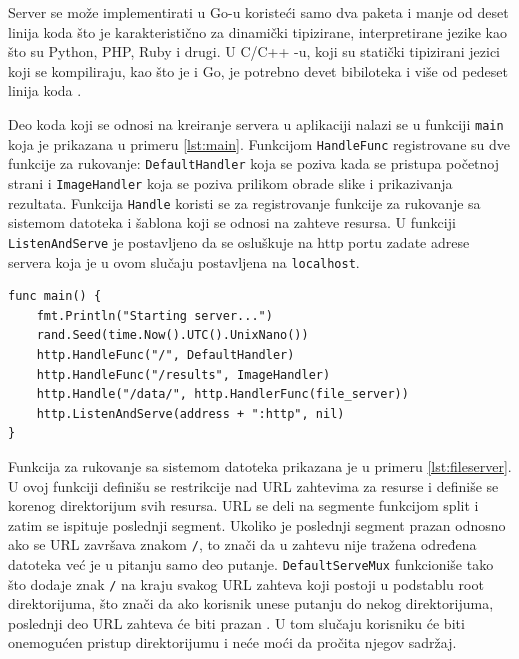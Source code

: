 \documentclass[12pt,oneside]{memoir}
\begin{document}
Server se može implementirati u Go-u  koristeći samo dva paketa i manje od deset linija koda što je karakteristično za dinamički tipizirane, interpretirane jezike kao što su Python, PHP, Ruby i drugi. U C/C++ -u, koji su statički tipizirani jezici koji se kompiliraju, kao što je i Go, je potrebno devet bibiloteka i više od pedeset linija koda \cite{server}.

Deo koda koji se odnosi na kreiranje servera u aplikaciji nalazi se u funkciji \texttt{main} koja je prikazana u primeru \ref{lst:main}. Funkcijom \texttt{HandleFunc} registrovane su dve funkcije za rukovanje: \texttt{DefaultHandler} koja se poziva kada se pristupa početnoj strani i \texttt{ImageHandler} koja se poziva prilikom obrade slike i prikazivanja rezultata. Funkcija \texttt{Handle} koristi se za registrovanje funkcije za rukovanje sa sistemom datoteka i šablona koji se odnosi na zahteve resursa.  U funkciji \texttt{ListenAndServe} je postavljeno da se osluškuje na http portu zadate adrese servera koja je u ovom slučaju postavljena na \texttt{localhost}.

\begin{center}
\begin{lstlisting}[caption={Funkcija \texttt{main}, kreiranje servera},label={lst:main},  backgroundcolor=\color{background} ]
func main() {
	fmt.Println("Starting server...")
	rand.Seed(time.Now().UTC().UnixNano())
	http.HandleFunc("/", DefaultHandler)
	http.HandleFunc("/results", ImageHandler)
	http.Handle("/data/", http.HandlerFunc(file_server))
	http.ListenAndServe(address + ":http", nil)
}
\end{lstlisting}
\end{center}

\label{fileserver}Funkcija za rukovanje sa sistemom datoteka prikazana je u primeru \ref{lst:fileserver}. U ovoj funkciji definišu se restrikcije nad URL zahtevima za resurse i definiše se korenog direktorijum svih resursa. URL se deli na segmente funkcijom split i zatim se ispituje poslednji segment. Ukoliko je poslednji segment prazan odnosno ako se URL završava znakom \texttt{/}, to znači da u zahtevu nije tražena određena datoteka već je u pitanju samo deo putanje. \texttt{DefaultServeMux} funkcioniše tako što dodaje znak \texttt{/} na kraju svakog URL zahteva koji postoji u podstablu root direktorijuma, što znači da ako korisnik unese putanju do nekog direktorijuma, poslednji deo URL zahteva će biti prazan \cite{http}. U tom slučaju korisniku će biti onemogućen pristup direktorijumu i neće moći da pročita njegov sadržaj.
\end{document}

